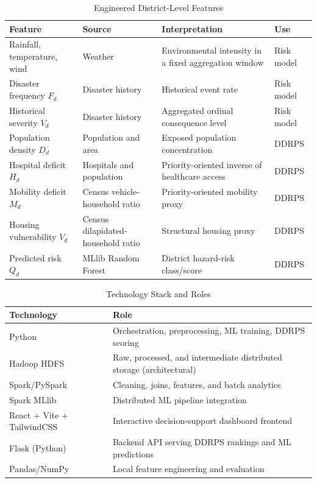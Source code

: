 \documentclass[conference]{IEEEtran}
\begin{document}
\begin{table}[t]
\caption{Engineered District-Level Features}
\label{tab:features}
\centering
\small
\begin{tabularx}{\textwidth}{@{}l l Y l@{}}
\toprule
Feature & Source & Interpretation & Use \\
\midrule
Rainfall, temperature, wind & Weather & Environmental intensity in a fixed aggregation window & Risk model \\
Disaster frequency $F_d$ & Disaster history & Historical event rate & Risk model \\
Historical severity $V_d$ & Disaster history & Aggregated ordinal consequence level & Risk model \\
Population density $D_d$ & Population and area & Exposed population concentration & DDRPS \\
Hospital deficit $H_d$ & Hospitals and population & Priority-oriented inverse of healthcare access & DDRPS \\
Mobility deficit $M_d$ & Census vehicle-household ratio & Priority-oriented mobility proxy & DDRPS \\
Housing vulnerability $V_d$ & Census dilapidated-household ratio & Structural housing proxy & DDRPS \\
Predicted risk $Q_d$ & MLlib Random Forest & District hazard-risk class/score & DDRPS \\
\bottomrule
\end{tabularx}
\end{table}

\begin{table}[t]
\caption{Technology Stack and Roles}
\label{tab:stack}
\centering
\footnotesize
\begin{tabularx}{\columnwidth}{@{}l Y@{}}
\toprule
Technology & Role \\
\midrule
Python & Orchestration, preprocessing, ML training, DDRPS scoring \\
Hadoop HDFS & Raw, processed, and intermediate distributed storage (architectural) \\
Spark/PySpark & Cleaning, joins, features, and batch analytics \\
Spark MLlib & Distributed ML pipeline integration \\
React + Vite + TailwindCSS & Interactive decision-support dashboard frontend \\
Flask (Python) & Backend API serving DDRPS rankings and ML predictions \\
Pandas/NumPy & Local feature engineering and evaluation \\
\bottomrule
\end{tabularx}
\end{table}
\end{document}
